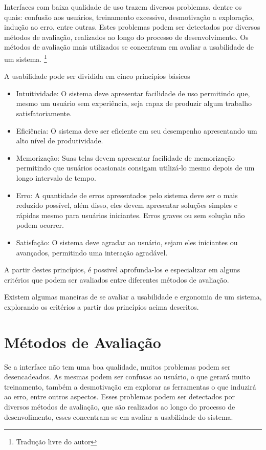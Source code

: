 Interfaces com baixa qualidade de uso trazem diversos problemas, dentre os quais:
confusão aos usuários, treinamento excessivo, desmotivação a exploração, indução ao
erro, entre outras. Estes problemas podem ser detectados por diversos métodos de
avaliação, realizados ao longo do processo de desenvolvimento. Os métodos de
avaliação mais utilizados se concentram em avaliar a usabilidade de um sistema.
\cite{maguire_context_of_use}\footnote{Tradução livre do autor}


A usabilidade pode ser dividida em cinco princípios básicos 

\begin{itemize}
  \item Intuitividade: O sistema deve apresentar facilidade de uso permitindo que, mesmo um usuário sem experiência, seja capaz de produzir algum trabalho satisfatoriamente.
  \item Eficiência: O sistema deve ser eficiente em seu desempenho apresentando um alto nível de produtividade.
  \item Memorização: Suas telas devem apresentar facilidade de memorização permitindo que usuários ocasionais consigam utilizá-lo mesmo depois de um longo intervalo de tempo.
  \item Erro: A quantidade de erros apresentados pelo sistema deve ser o mais reduzido possível, além disso, eles devem apresentar soluções simples e rápidas mesmo para usuários iniciantes. Erros graves ou sem solução não podem ocorrer.
  \item Satisfação: O sistema deve agradar ao usuário, sejam eles iniciantes ou avançados, permitindo uma interação agradável.
\end{itemize}
\cite{nielsen_usabilidade}


A partir destes princípios, é possivel aprofunda-los e especializar em alguns critérios que podem ser avaliados entre diferentes métodos de avaliação.

Existem algumas maneiras de se avaliar a usabilidade e ergonomia de um sistema, explorando os critérios a partir dos princípios acima descritos.

\section{Métodos de Avaliação}

Se a interface não tem uma boa qualidade, muitos problemas podem ser desencadeados. As mesmas podem ser confusas ao usuário, o que gerará muito treinamento, também a desmotivação em explorar as ferramentas o que induzirá ao erro, entre outros aspectos.
Esses problemas podem ser detectados por diversos métodos de avaliação, que são realizados ao longo do processo de desenvolimento, esses concentram-se em avaliar a usabilidade do sistema.
\cite{desigining_user_interface}


